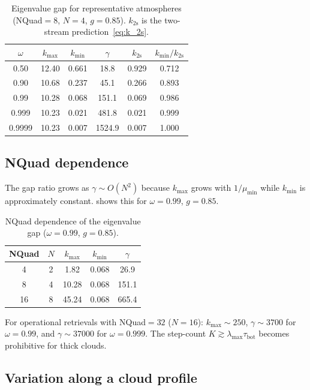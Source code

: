 \documentclass[11pt,a4paper]{article}
\newcommand{\tbot}{\tau_{\mathrm{bot}}}
\newcommand{\kmax}{k_{\max}}
\newcommand{\kmin}{k_{\min}}
\theoremstyle{definition}
\begin{document}
\begin{table}[h]\centering
\caption{Eigenvalue gap for representative atmospheres (NQuad${}=8$,
$N\!=\!4$, $g=0.85$).  $k_{2\mathrm{s}}$ is the two-stream prediction~\eqref{eq:k_2s}.}
\label{tab:eigenvalues}
\begin{tabular}{cccccc}
\toprule
$\omega$ & $\kmax$ & $\kmin$ & $\gamma$ & $k_{2\mathrm{s}}$ & $\kmin/k_{2\mathrm{s}}$ \\
\midrule
0.50   & 12.40 & 0.661 &  18.8 & 0.929 & 0.712 \\
0.90   & 10.68 & 0.237 &  45.1 & 0.266 & 0.893 \\
0.99   & 10.28 & 0.068 & 151.1 & 0.069 & 0.986 \\
0.999  & 10.23 & 0.021 & 481.8 & 0.021 & 0.999 \\
0.9999 & 10.23 & 0.007 & 1524.9 & 0.007 & 1.000 \\
\bottomrule
\end{tabular}
\end{table}

\subsection{NQuad dependence}

The gap ratio grows as $\gamma\sim O(N^2)$ because $\kmax$ grows with
$1/\mu_{\min}$ while $\kmin$ is approximately constant.
 shows this for $\omega=0.99$, $g=0.85$.

\begin{table}[h]\centering
\caption{NQuad dependence of the eigenvalue gap ($\omega=0.99$,
$g=0.85$).}
\label{tab:nquad_gap}
\begin{tabular}{ccccc}
\toprule
NQuad & $N$ & $\kmax$ & $\kmin$ & $\gamma$ \\
\midrule
 4 &  2 &   1.82 & 0.068 &   26.9 \\
 8 &  4 &  10.28 & 0.068 &  151.1 \\
16 &  8 &  45.24 & 0.068 &  665.4 \\
\bottomrule
\end{tabular}
\end{table}

For operational retrievals with NQuad${}=32$ ($N\!=\!16$):
$\kmax\sim 250$, $\gamma\sim 3700$ for $\omega=0.99$, and
$\gamma\sim 37000$ for $\omega=0.999$.  The step-count
$K\gtrsim\lambda_{\max}\tbot$ becomes prohibitive for thick clouds.

\subsection{Variation along a cloud profile}
\end{document}
